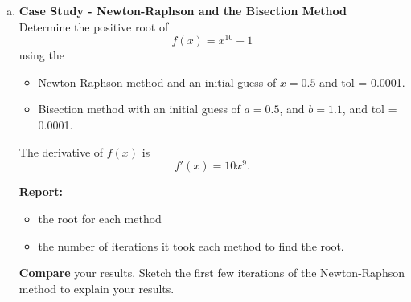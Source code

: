 \documentclass[11pt]{article}
\begin{document}
\newpage
\begin{enumerate}[(c)]
	\item \textbf{Case Study - Newton-Raphson and the Bisection Method}\\
	Determine the positive root of $$f(x) = x^{10} - 1$$ using the 
	\begin{itemize}
		\item Newton-Raphson method and an initial guess of $x = 0.5$ and tol = 0.0001.
		\item Bisection method with an initial guess of $a = 0.5$, and $b = 1.1$, and tol = 0.0001.
	\end{itemize}
    The derivative of $f(x)$ is $$f'(x) = 10x^9.$$
   
	\textbf{Report:}
	\begin{itemize}
		\item the root for each method
		\item the number of iterations it took each method to find the root.
	\end{itemize}
	\textbf{Compare} your results. Sketch the first few iterations of the Newton-Raphson method to explain your results.
\end{enumerate}
 
\end{document}
